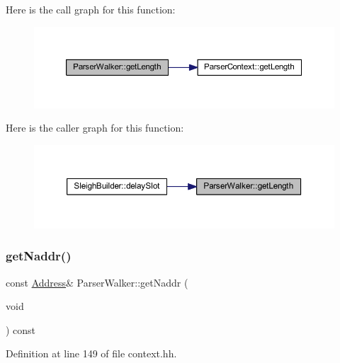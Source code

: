 Here is the call graph for this function\+:
\nopagebreak
\begin{figure}[H]
\begin{center}
\leavevmode
\includegraphics[width=350pt]{class_parser_walker_a77de14662fd97ff54b79b510dcdd7f1d_cgraph}
\end{center}
\end{figure}
Here is the caller graph for this function\+:
\nopagebreak
\begin{figure}[H]
\begin{center}
\leavevmode
\includegraphics[width=350pt]{class_parser_walker_a77de14662fd97ff54b79b510dcdd7f1d_icgraph}
\end{center}
\end{figure}
\mbox{\label{class_parser_walker_a32fdda0fe14a36c08a4740550e40c0ea}} 
\subsubsection{\texorpdfstring{getNaddr()}{getNaddr()}}
{\footnotesize\ttfamily const \mbox{\hyperlink{class_address}{Address}}\& Parser\+Walker\+::get\+Naddr (\begin{DoxyParamCaption}\item[{void}]{ }\end{DoxyParamCaption}) const\hspace{0.3cm}{\ttfamily [inline]}}



Definition at line 149 of file context.\+hh.

